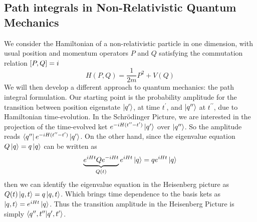\subsection{Path integrals in Non-Relativistic Quantum Mechanics}
We consider the Hamiltonian of a non-relativistic particle in one dimension, with usual position and momentum operators $P$ and $Q$ satisfying the commutation relation $ \comm{P}{Q}=i$
\begin{equation}
    H(P,Q)=\frac{1}{2m}P^2+V(Q)
    \label{quantum_hamiltonian1d}
\end{equation}
We will then develop a different approach to quantum mechanics: the path integral formulation. Our starting point is the probability amplitude for the transition between position eigenstate $\ket{q^\prime}$, at time $t^\prime$, and $\ket{q^{\prime\prime}}$ at $t^{\prime\prime}$, due to Hamiltonian time-evolution. In the Schrödinger Picture, we are interested in the projection of the time-evolved ket $e^{-iH(t^{\prime\prime}-t^{\prime})}\ket{q^{\prime}}$ over $\ket{q^{\prime\prime}}$. So the amplitude reads $\bra{q^{\prime\prime}}e^{-iH(t^{\prime\prime}-t^{\prime})}\ket{q^{\prime}}$. On the other hand, since the eigenvalue equation $Q\ket{q}=q\ket{q}$ can be written as
\begin{equation}
    \underbrace{e^{iHt}Qe^{-iHt}}_{Q(t)}e^{iHt}\ket{q}=qe^{iHt}\ket{q}
\end{equation}
then we can identify  the eigenvalue equation in the Heisenberg picture as $Q(t)\ket{q,t}=q\ket{q,t}$. Which brings time dependence to the basis kets as $\ket{q,t}=e^{iHt}\ket{q}$. Thus the transition amplitude in the Heisenberg Picture is simply $\braket{q^{\prime\prime},t^{\prime\prime}}{q^{\prime},t^{\prime}}$.\\

